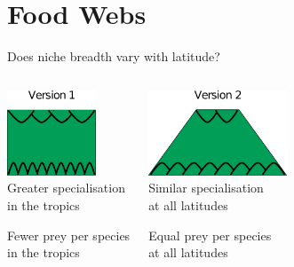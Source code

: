 \documentclass{beamer}
\begin{document}
\section*{Food Webs}
  \begin{frame}{Does niche breadth vary with latitude?}
    \begin{columns}
    \column{.5in}
    \column{1.75in}
      \begin{center}
      \includegraphics[height=1in]{Figures/version1.eps}\\
      \vspace{.5cm}
      Greater specialisation\\in the tropics

      \vspace{.25cm}
      {\color{white}Fewer prey per species\\in the tropics}

      \end{center}
    \column{.5in}
    \column{1.75in}
      \begin{center}
      \includegraphics[height=1in]{Figures/version2.eps}\\
      \vspace{.5cm}
      Similar specialisation\\at all latitudes

      \vspace{.25cm}
      {\color{white}Equal prey per species\\at all latitudes}

      \end{center}
    \column{.5in}
    \end{columns}

  \end{frame}
\end{document}
